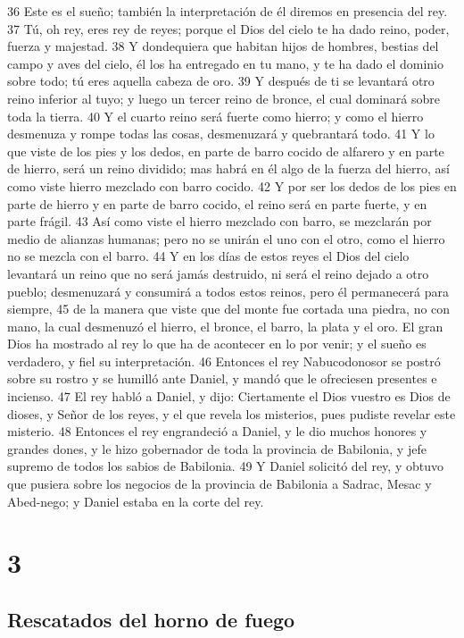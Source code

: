 36 Este es el sueño; también la interpretación de él diremos en presencia del rey.
37 Tú, oh rey, eres rey de reyes; porque el Dios del cielo te ha dado reino, poder, fuerza y majestad.
38 Y dondequiera que habitan hijos de hombres, bestias del campo y aves del cielo, él los ha entregado en tu mano, y te ha dado el dominio sobre todo; tú eres aquella cabeza de oro.
39 Y después de ti se levantará otro reino inferior al tuyo; y luego un tercer reino de bronce, el cual dominará sobre toda la tierra.
40 Y el cuarto reino será fuerte como hierro; y como el hierro desmenuza y rompe todas las cosas, desmenuzará y quebrantará todo.
41 Y lo que viste de los pies y los dedos, en parte de barro cocido de alfarero y en parte de hierro, será un reino dividido; mas habrá en él algo de la fuerza del hierro, así como viste hierro mezclado con barro cocido.
42 Y por ser los dedos de los pies en parte de hierro y en parte de barro cocido, el reino será en parte fuerte, y en parte frágil.
43 Así como viste el hierro mezclado con barro, se mezclarán por medio de alianzas humanas; pero no se unirán el uno con el otro, como el hierro no se mezcla con el barro.
44 Y en los días de estos reyes el Dios del cielo levantará un reino que no será jamás destruido, ni será el reino dejado a otro pueblo; desmenuzará y consumirá a todos estos reinos, pero él permanecerá para siempre,
45 de la manera que viste que del monte fue cortada una piedra, no con mano, la cual desmenuzó el hierro, el bronce, el barro, la plata y el oro. El gran Dios ha mostrado al rey lo que ha de acontecer en lo por venir; y el sueño es verdadero, y fiel su interpretación.
46 Entonces el rey Nabucodonosor se postró sobre su rostro y se humilló ante Daniel, y mandó que le ofreciesen presentes e incienso.
47 El rey habló a Daniel, y dijo: Ciertamente el Dios vuestro es Dios de dioses, y Señor de los reyes, y el que revela los misterios, pues pudiste revelar este misterio.
48 Entonces el rey engrandeció a Daniel, y le dio muchos honores y grandes dones, y le hizo gobernador de toda la provincia de Babilonia, y jefe supremo de todos los sabios de Babilonia.
49 Y Daniel solicitó del rey, y obtuvo que pusiera sobre los negocios de la provincia de Babilonia a Sadrac, Mesac y Abed-nego; y Daniel estaba en la corte del rey.

\chapter{3}

\section*{Rescatados del horno de fuego}

